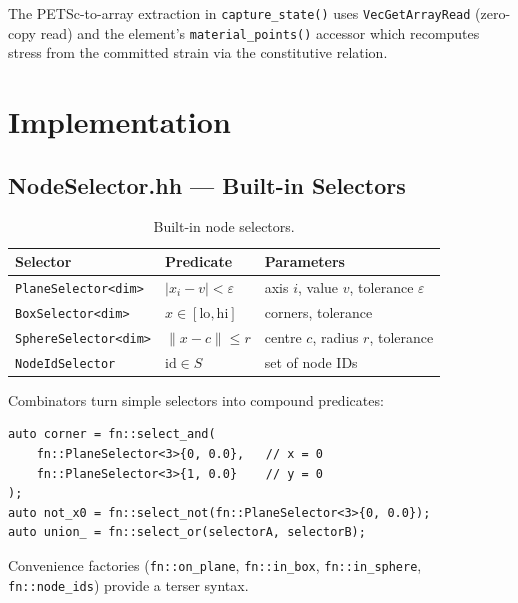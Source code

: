 The PETSc-to-array extraction in \texttt{capture\_state()} uses
\texttt{VecGetArrayRead} (zero-copy read) and the element's
\texttt{material\_points()} accessor which recomputes stress from the
committed strain via the constitutive relation.


\section{Implementation}
\label{sec:bc-impl}

\subsection{NodeSelector.hh — Built-in Selectors}

\begin{table}[ht]
\centering\small
\caption{Built-in node selectors.}
\label{tab:selectors}
\begin{tabular}{lll}
\toprule
\textbf{Selector} & \textbf{Predicate} & \textbf{Parameters} \\
\midrule
\texttt{PlaneSelector<dim>}  & $|x_i - v| < \varepsilon$
                             & axis $i$, value $v$, tolerance $\varepsilon$ \\
\texttt{BoxSelector<dim>}    & $x \in [\text{lo},\text{hi}]$
                             & corners, tolerance \\
\texttt{SphereSelector<dim>} & $\|x - c\| \le r$
                             & centre $c$, radius $r$, tolerance \\
\texttt{NodeIdSelector}      & $\text{id} \in S$
                             & set of node IDs \\
\bottomrule
\end{tabular}
\end{table}

\noindent
Combinators turn simple selectors into compound predicates:

\begin{lstlisting}
auto corner = fn::select_and(
    fn::PlaneSelector<3>{0, 0.0},   // x = 0
    fn::PlaneSelector<3>{1, 0.0}    // y = 0
);
auto not_x0 = fn::select_not(fn::PlaneSelector<3>{0, 0.0});
auto union_ = fn::select_or(selectorA, selectorB);
\end{lstlisting}

\noindent
Convenience factories (\texttt{fn::on\_plane}, \texttt{fn::in\_box},
\texttt{fn::in\_sphere}, \texttt{fn::node\_ids}) provide a terser syntax.


